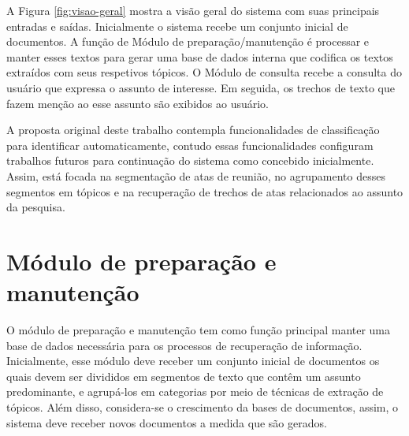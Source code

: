 A Figura \ref{fig:visao-geral} mostra a visão geral do sistema com suas principais entradas e saídas. Inicialmente o sistema recebe um conjunto inicial de documentos. A função de Módulo de preparação/manutenção é processar e manter esses textos para gerar uma base de dados interna que codifica os textos extraídos com seus respetivos tópicos. O Módulo de consulta recebe a consulta do usuário que expressa o assunto de interesse. Em seguida, os trechos de texto que fazem menção ao esse assunto são exibidos ao usuário.




A proposta original deste trabalho contempla funcionalidades de classificação para identificar automaticamente, contudo essas funcionalidades configuram trabalhos futuros para continuação do sistema como concebido inicialmente. Assim, está focada na segmentação de atas de reunião, no agrupamento desses segmentos em tópicos e na recuperação de trechos de atas relacionados ao assunto da pesquisa.





\section{Módulo de preparação e manutenção}\label{sec:modulo-preparacao}


O módulo de preparação e manutenção tem como função principal manter uma base de dados necessária para os processos de recuperação de informação. Inicialmente, esse módulo deve receber um conjunto inicial de documentos os quais devem ser divididos em segmentos de texto que contêm um assunto predominante, e agrupá-los em categorias por meio de técnicas de extração de tópicos. Além disso, considera-se o crescimento da bases de documentos, assim, o sistema deve receber novos documentos a medida que são gerados. 















